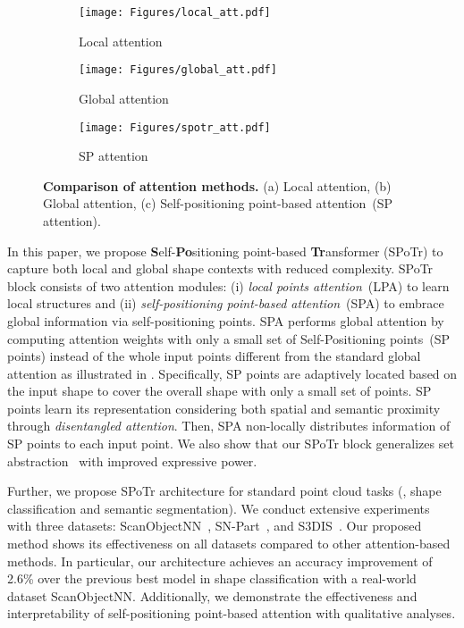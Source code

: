 \documentclass[10pt,twocolumn,letterpaper]{article}
\begin{document}
\begin{figure}[t]
     \centering
     \begin{subfigure}[b]{0.156\textwidth}
         \centering
         \texttt{[image: Figures/local\_att.pdf]}
         \caption{Local attention}
         \label{fig:local_att}
     \end{subfigure}
\begin{subfigure}[b]{0.156\textwidth}
         \centering
         \texttt{[image: Figures/global\_att.pdf]}
         \caption{Global attention}
         \label{fig:global_att}
     \end{subfigure}
     \begin{subfigure}[b]{0.156\textwidth}
         \centering
         \texttt{[image: Figures/spotr\_att.pdf]}
         \caption{SP attention}
         \label{fig:spotr_att}
     \end{subfigure}
\caption{{\textbf{Comparison of attention methods.} (a) Local attention, (b) Global attention, (c) Self-positioning point-based attention~(SP attention).}}
        \label{fig:attentions}

\end{figure} 
In this paper, we propose \textbf{S}elf-\textbf{Po}sitioning point-based \textbf{Tr}ansformer (SPoTr) to capture both local and global shape contexts with reduced complexity.
SPoTr block consists of two attention modules: (i) \textit{local points attention}~(LPA) to learn local structures and (ii) \textit{self-positioning point-based attention}~(SPA) to embrace global information via self-positioning points. 
SPA performs global attention by computing attention weights with only a small set of Self-Positioning points~(SP points) instead of the whole input points different from the standard global attention as illustrated in .
Specifically, SP points are adaptively located based on the input shape to cover the overall shape with only a small set of points. 
SP points learn its representation  considering both spatial and semantic proximity through \textit{disentangled attention}.
{Then, SPA non-locally distributes information of SP points to each input point.
We also show that our SPoTr block generalizes set abstraction~\cite{qi2017pointnet++} with improved expressive power.}

Further, we propose SPoTr architecture for standard point cloud tasks (\eg, shape classification and semantic segmentation).
We conduct extensive experiments with three datasets: ScanObjectNN~\cite{uy2019revisiting}, SN-Part~\cite{snpart}, and S3DIS~\cite{armeni20163d}.
Our proposed method shows its effectiveness on all datasets compared to other attention-based methods.
In particular, our architecture achieves an accuracy improvement of 2.6\% over the previous best model in shape classification with a real-world dataset ScanObjectNN.
Additionally, we demonstrate the effectiveness and interpretability of self-positioning point-based attention with qualitative analyses.  
\end{document}
